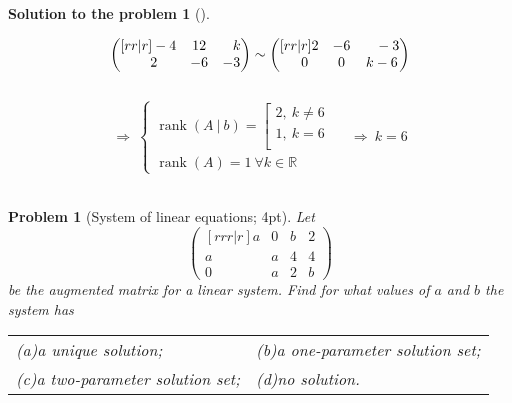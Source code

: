 \documentclass[12pt,a4]{article}
\newtheorem{problem}{Problem}
\newtheorem{solution}{Solution to the problem}
\newcommand\rank{\operatorname{rank}}
\begin{document}
\begin{solution}[]
\begin{enumerate}[(a)]
\[
\begin{pmatrix}[rr|r]
-4 & 12 & \hphantom{-}k \\
\hphantom{-}2 & -6 & -3
\end{pmatrix}
\sim
\begin{pmatrix}[rr|r]
2 & -6 & \hphantom{-}-3 \\
\hphantom{-}0 & 0 & k-6
\end{pmatrix}
\]\\
\[
\Rightarrow ~
\left\{\begin{matrix}
\rank(A~|~b) = 
\left[\begin{matrix}
2,~k \neq 6 \\
1,~k = 6 \\
\end{matrix}\right.\\[12pt]
\rank(A) = 1~\forall k \in \mathbb{R}
\end{matrix}\right. \quad
\Rightarrow~k = 6
\]\\
\end{enumerate}
\end{solution}

\begin{problem}[System of linear equations; 4pt]
	\rm Let
	\[
	\begin{pmatrix}[rrr|r]
	a & 0 & b & 2\\
	a & a & 4 & 4\\
	0 & a & 2 & b
	\end{pmatrix}
	\]
	be the augmented matrix for a linear system. Find for what values of $a$ and $b$ the system has\\[2pt]
\begin{tabular}{ll}
	(a)\quad a unique solution; &
	(b)\quad a one-parameter solution set;\\
	(c)\quad a two-parameter solution set; \hspace*{2cm} &
	(d)\quad no solution.
\end{tabular}
\end{problem}
\end{document}
